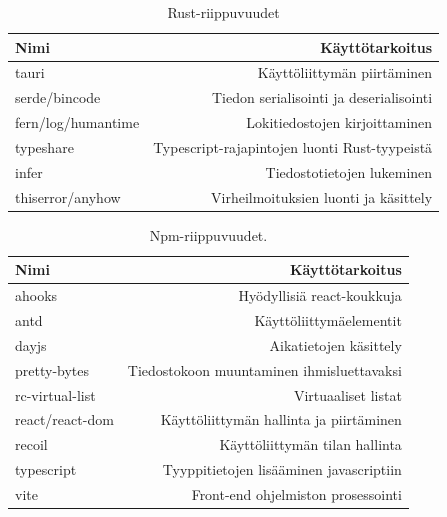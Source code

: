 \documentclass[a4paper,12pt]{article}
\begin{document}
    \begin{table}[h!]
        \centering
        \begin{tabularx}{\textwidth}{|X|r|}
        \hline
            \textbf{Nimi}      & \textbf{Käyttötarkoitus}            \\ \hline
            tauri              & Käyttöliittymän piirtäminen                                   \\ \hline
            serde/bincode      & Tiedon serialisointi ja deserialisointi                       \\ \hline
            fern/log/humantime & Lokitiedostojen kirjoittaminen                                \\ \hline
            typeshare          & Typescript-rajapintojen luonti Rust-tyypeistä \\ \hline
            infer              & Tiedostotietojen lukeminen                                    \\ \hline
            thiserror/anyhow   & Virheilmoituksien luonti ja käsittely \\ \hline
        \end{tabularx}
        \caption{Rust-riippuvuudet}
        \label{tab:cargo_dependencies}
    \end{table}


    \begin{table}[h!]
        \centering
        \begin{tabularx}{\textwidth}{|X|r|}
        \hline
            \textbf{Nimi}            & \textbf{Käyttötarkoitus}                           \\ \hline
            ahooks          & Hyödyllisiä react-koukkuja                \\ \hline
            antd            & Käyttöliittymäelementit                  \\ \hline
            dayjs           & Aikatietojen käsittely                   \\ \hline
            pretty-bytes    & Tiedostokoon muuntaminen ihmisluettavaksi \\ \hline
            rc-virtual-list & Virtuaaliset listat                       \\ \hline
            react/react-dom & Käyttöliittymän hallinta ja piirtäminen   \\ \hline
            recoil          & Käyttöliittymän tilan hallinta            \\ \hline
            typescript      & Tyyppitietojen lisääminen javascriptiin   \\  \hline
            vite            & Front-end ohjelmiston prosessointi \\ \hline
        \end{tabularx}
        \caption{Npm-riippuvuudet.}
        \label{tab:npm_dependencies}
    \end{table}
\end{document}
